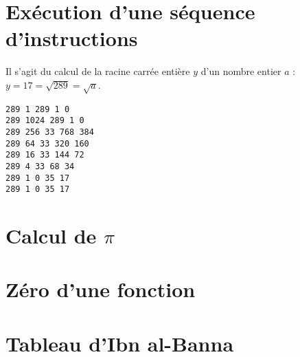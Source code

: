 \documentclass[11pt,a4paper]{article}
\begin{document}

\section{Exécution d'une séquence d'instructions}
%

\noindent\begin{minipage}{8cm}
Il s'agit du calcul de la racine carrée entière $y$ d'un nombre entier $a$ :
$y = 17 = \sqrt{289} = \sqrt{a}$.
\end{minipage}
\hfill
\begin{py}{7cm}
\begin{verbatim}
289 1 289 1 0
289 1024 289 1 0
289 256 33 768 384
289 64 33 320 160
289 16 33 144 72
289 4 33 68 34
289 1 0 35 17
289 1 0 35 17
\end{verbatim}
\end{py}

\section{Calcul de $\pi$}



\section{Zéro d'une fonction}


\section{Tableau d'Ibn al-Banna}


\label{fini}
\end{document}
